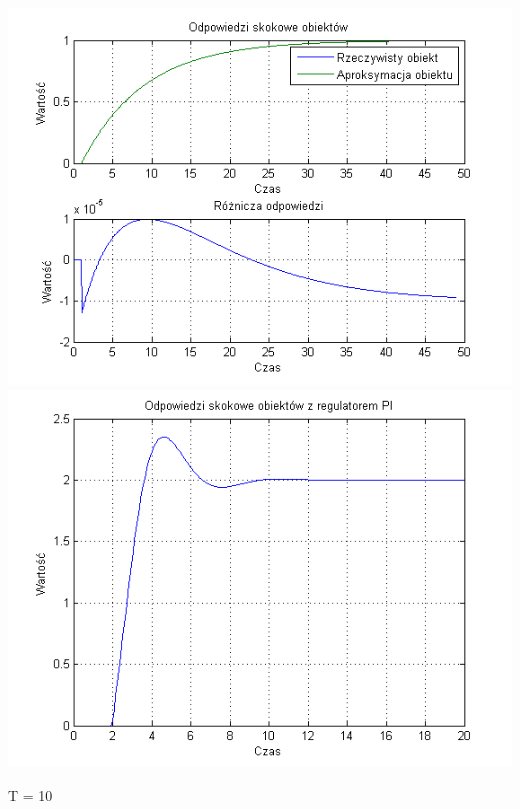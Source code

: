 \documentclass[10pt,a4paper]{article}
\begin{document}
\begin{center}
\includegraphics[scale=1]{images/jeden/skrypt_27.png}\\
\includegraphics[scale=1]{images/jeden/skrypt_28.png}\\
\end{center}
\newpage
T = 10
\end{document}

